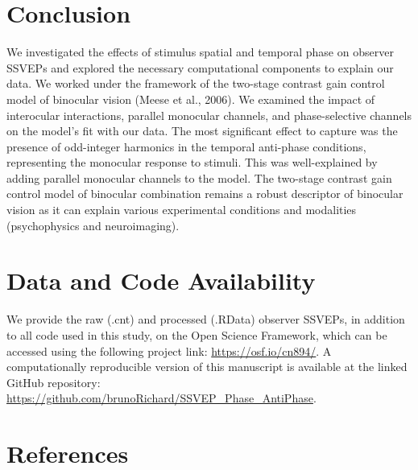 \documentclass[review,
  12pt,
]{elsarticle}
\begin{document}
\section{Conclusion}\label{conclusion}

We investigated the effects of stimulus spatial and temporal phase on
observer SSVEPs and explored the necessary computational components to
explain our data. We worked under the framework of the two-stage
contrast gain control model of binocular vision (Meese et al., 2006). We
examined the impact of interocular interactions, parallel monocular
channels, and phase-selective channels on the model's fit with our data.
The most significant effect to capture was the presence of odd-integer
harmonics in the temporal anti-phase conditions, representing the
monocular response to stimuli. This was well-explained by adding
parallel monocular channels to the model. The two-stage contrast gain
control model of binocular combination remains a robust descriptor of
binocular vision as it can explain various experimental conditions and
modalities (psychophysics and neuroimaging).

\section{Data and Code Availability}\label{data-and-code-availability}

We provide the raw (.cnt) and processed (.RData) observer SSVEPs, in
addition to all code used in this study, on the Open Science Framework,
which can be accessed using the following project link:
\url{https://osf.io/cn894/}. A computationally reproducible version of
this manuscript is available at the linked GitHub repository:
\url{https://github.com/brunoRichard/SSVEP_Phase_AntiPhase}.

\section*{References}\label{references}
\end{document}
